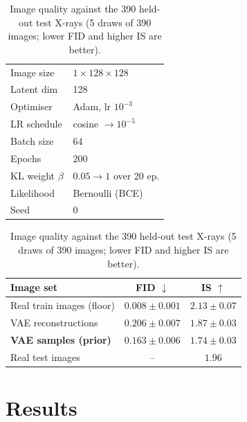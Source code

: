 \documentclass{article}
\begin{document}
\begin{table}[t]
  \centering
  \begin{minipage}[t]{0.40\linewidth}
    \centering
    \caption{Hyperparameters.}
    \label{tab:hparams}
    \small
    \begin{tabular}{@{}ll@{}}
      \toprule
      Image size & $1\times128\times128$ \\
      Latent dim & 128 \\
      Optimiser & Adam, lr $10^{-3}$ \\
      LR schedule & cosine $\to 10^{-5}$ \\
      Batch size & 64 \\
      Epochs & 200 \\
      KL weight $\beta$ & $0.05\!\to\!1$ over 20 ep. \\
      Likelihood & Bernoulli (BCE) \\
      Seed & 0 \\
      \bottomrule
    \end{tabular}
  \end{minipage}\hfill
  \begin{minipage}[t]{0.57\linewidth}
    \centering
    \caption{Image quality against the 390 held-out test X-rays
      (5 draws of 390 images; lower FID and higher IS are better).}
    \label{tab:metrics}
    \small
    \begin{tabular}{@{}lcc@{}}
      \toprule
      Image set & FID $\downarrow$ & IS $\uparrow$ \\
      \midrule
      Real train images (floor) & $0.008 \pm 0.001$ & $2.13 \pm 0.07$ \\
      VAE reconstructions & $0.206 \pm 0.007$ & $1.87 \pm 0.03$ \\
      \textbf{VAE samples (prior)} & $\mathbf{0.163 \pm 0.006}$ & $\mathbf{1.74 \pm 0.03}$ \\
      \midrule
      Real test images & -- & $1.96$ \\
      \bottomrule
    \end{tabular}
  \end{minipage}
\end{table}

\section{Results}
\end{document}
